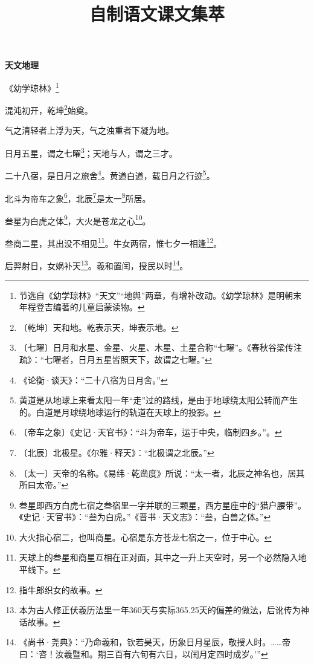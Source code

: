 \documentclass[12pt,UTF-8,openany]{ctexbook}
\title{\zihao{0} \bfseries 自制语文课文集萃}
\author{}
\date{}
\begin{document}

\begin{center}
    \begin{Huge}
        \textbf{天文地理}
    \end{Huge}
    
    \vspace{8pt}
    《幼学琼林》\footnote{节选自《幼学琼林》“天文”“地舆”两章，有增补改动。《幼学琼林》是明朝末年程登吉编著的儿童启蒙读物。}
    \vspace{8pt}

\end{center}

\begin{normalsize}
    
    混沌初开，乾坤\footnote{〔乾坤〕天和地。乾表示天，坤表示地。}始奠。

    气之清轻者上浮为天，气之浊重者下凝为地。
    
    日月五星，谓之七曜\footnote{〔七曜〕日月和水星、金星、火星、木星、土星合称“七曜”。《春秋谷梁传注疏》：“七曜者，日月五星皆照天下，故谓之七曜。”}；天地与人，谓之三才。
    
    二十八宿，是日月之旅舍\footnote{《论衡·谈天》：“二十八宿为日月舍。”}。黄道白道，载日月之行迹\footnote{黄道是从地球上来看太阳一年“走”过的路线，是由于地球绕太阳公转而产生的。白道是月球绕地球运行的轨道在天球上的投影。}。
    
    北斗为帝车之象\footnote{〔帝车之象〕《史记·天官书》：“斗为帝车，运于中央，临制四乡。”。}，北辰\footnote{〔北辰〕北极星。《尔雅·释天》：“北极谓之北辰。” }是太一\footnote{〔太一〕天帝的名称。《易纬·乾凿度》所说：“太一者，北辰之神名也，居其所曰太帝。” }所居。
    
    叁星为白虎之体\footnote{叁星即西方白虎七宿之叁宿里一字并联的三颗星，西方星座中的“猎户腰带”。《史记·天官书》：“叁为白虎。”《晋书·天文志》：“叁，白兽之体。”}，大火是苍龙之心\footnote{大火指心宿二，也叫商星。心宿是东方苍龙七宿之一，位于中心。}。
    
    叁商二星，其出没不相见\footnote{天球上的叁星和商星互相在正对面，其中之一升上天空时，另一个必然隐入地平线下。}。牛女两宿，惟七夕一相逢\footnote{指牛郎织女的故事。}。
    
    后羿射日，女娲补天\footnote{本为古人修正伏羲历法里一年360天与实际365.25天的偏差的做法，后讹传为神话故事。}。羲和置闰，授民以时\footnote{《尚书·尧典》：“乃命羲和，钦若昊天，历象日月星辰，敬授人时。……帝曰：‘咨！汝羲暨和。期三百有六旬有六日，以闰月定四时成岁。’”}。
    

\end{normalsize}
\end{document}
